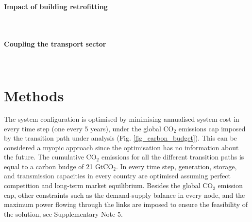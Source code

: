 \documentclass[5p]{elsarticle} %
\begin{document}
\paragraph{\textbf{Impact of building retrofitting}} \
\paragraph{\textbf{Coupling the transport sector}} \



\section{Methods}

The system configuration is optimised by minimising annualised system cost in every time step (one every 5 years), under the global CO$_2$ emissions cap imposed by the transition path under analysis (Fig. \ref{fig_carbon_budget}). This can be considered a myopic approach since the optimisation has no information about the future. The cumulative CO$_2$ emissions for all the different transition paths is equal to a carbon budge of 21 GtCO$_2$. In every time step, generation, storage, and transmission capacities in every country are optimised assuming perfect competition and long-term market equilibrium. Besides the global CO$_2$ emission cap, other constraints such as the demand-supply balance in every node, and the maximum power flowing through the links are imposed to ensure the feasibility of the solution, see Supplementary Note 5. \
\end{document}
